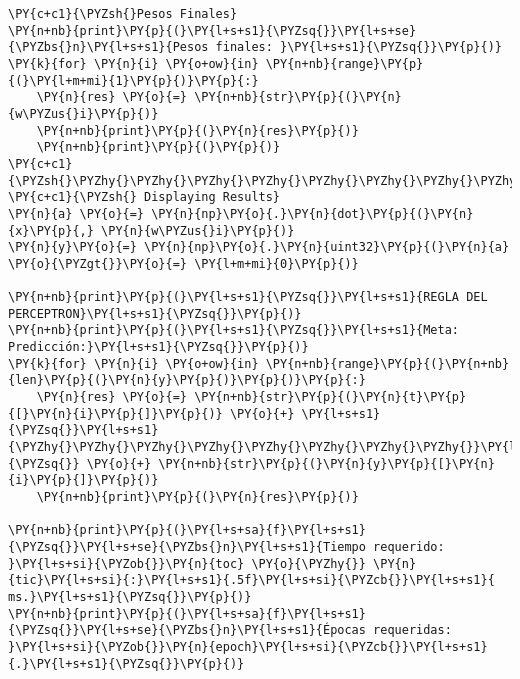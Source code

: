     \begin{tcolorbox}[breakable, size=fbox, boxrule=1pt, pad at break*=1mm,colback=cellbackground, colframe=cellborder]
\begin{Verbatim}[commandchars=\\\{\}]
\PY{c+c1}{\PYZsh{}Pesos Finales}
\PY{n+nb}{print}\PY{p}{(}\PY{l+s+s1}{\PYZsq{}}\PY{l+s+se}{\PYZbs{}n}\PY{l+s+s1}{Pesos finales: }\PY{l+s+s1}{\PYZsq{}}\PY{p}{)}
\PY{k}{for} \PY{n}{i} \PY{o+ow}{in} \PY{n+nb}{range}\PY{p}{(}\PY{l+m+mi}{1}\PY{p}{)}\PY{p}{:}
    \PY{n}{res} \PY{o}{=} \PY{n+nb}{str}\PY{p}{(}\PY{n}{w\PYZus{}i}\PY{p}{)}
    \PY{n+nb}{print}\PY{p}{(}\PY{n}{res}\PY{p}{)}
    \PY{n+nb}{print}\PY{p}{(}\PY{p}{)}
\PY{c+c1}{\PYZsh{}\PYZhy{}\PYZhy{}\PYZhy{}\PYZhy{}\PYZhy{}\PYZhy{}\PYZhy{}\PYZhy{}\PYZhy{}\PYZhy{}\PYZhy{}\PYZhy{}\PYZhy{}\PYZhy{}\PYZhy{}\PYZhy{}\PYZhy{}\PYZhy{}\PYZhy{}\PYZhy{}\PYZhy{}\PYZhy{}\PYZhy{}\PYZhy{}\PYZhy{}\PYZhy{}\PYZhy{}\PYZhy{}\PYZhy{}\PYZhy{}\PYZhy{}\PYZhy{}\PYZhy{}\PYZhy{}\PYZhy{}\PYZhy{}\PYZhy{}\PYZhy{}\PYZhy{}\PYZhy{}\PYZhy{}\PYZhy{}\PYZhy{}\PYZhy{}\PYZhy{}\PYZhy{}\PYZhy{}\PYZhy{}\PYZhy{}\PYZhy{}\PYZhy{}\PYZhy{}\PYZhy{}\PYZhy{}\PYZhy{}\PYZhy{}\PYZhy{}\PYZhy{}\PYZhy{}\PYZhy{}\PYZhy{}\PYZhy{}\PYZhy{}\PYZhy{}\PYZhy{}\PYZhy{}}
\PY{c+c1}{\PYZsh{} Displaying Results}
\PY{n}{a} \PY{o}{=} \PY{n}{np}\PY{o}{.}\PY{n}{dot}\PY{p}{(}\PY{n}{x}\PY{p}{,} \PY{n}{w\PYZus{}i}\PY{p}{)}
\PY{n}{y}\PY{o}{=} \PY{n}{np}\PY{o}{.}\PY{n}{uint32}\PY{p}{(}\PY{n}{a} \PY{o}{\PYZgt{}}\PY{o}{=} \PY{l+m+mi}{0}\PY{p}{)}

\PY{n+nb}{print}\PY{p}{(}\PY{l+s+s1}{\PYZsq{}}\PY{l+s+s1}{REGLA DEL PERCEPTRON}\PY{l+s+s1}{\PYZsq{}}\PY{p}{)}
\PY{n+nb}{print}\PY{p}{(}\PY{l+s+s1}{\PYZsq{}}\PY{l+s+s1}{Meta:    Predicción:}\PY{l+s+s1}{\PYZsq{}}\PY{p}{)}
\PY{k}{for} \PY{n}{i} \PY{o+ow}{in} \PY{n+nb}{range}\PY{p}{(}\PY{n+nb}{len}\PY{p}{(}\PY{n}{y}\PY{p}{)}\PY{p}{)}\PY{p}{:}
    \PY{n}{res} \PY{o}{=} \PY{n+nb}{str}\PY{p}{(}\PY{n}{t}\PY{p}{[}\PY{n}{i}\PY{p}{]}\PY{p}{)} \PY{o}{+} \PY{l+s+s1}{\PYZsq{}}\PY{l+s+s1}{\PYZhy{}\PYZhy{}\PYZhy{}\PYZhy{}\PYZhy{}\PYZhy{}\PYZhy{}\PYZhy{}}\PY{l+s+s1}{\PYZsq{}} \PY{o}{+} \PY{n+nb}{str}\PY{p}{(}\PY{n}{y}\PY{p}{[}\PY{n}{i}\PY{p}{]}\PY{p}{)}
    \PY{n+nb}{print}\PY{p}{(}\PY{n}{res}\PY{p}{)}

\PY{n+nb}{print}\PY{p}{(}\PY{l+s+sa}{f}\PY{l+s+s1}{\PYZsq{}}\PY{l+s+se}{\PYZbs{}n}\PY{l+s+s1}{Tiempo requerido: }\PY{l+s+si}{\PYZob{}}\PY{n}{toc} \PY{o}{\PYZhy{}} \PY{n}{tic}\PY{l+s+si}{:}\PY{l+s+s1}{.5f}\PY{l+s+si}{\PYZcb{}}\PY{l+s+s1}{ ms.}\PY{l+s+s1}{\PYZsq{}}\PY{p}{)}
\PY{n+nb}{print}\PY{p}{(}\PY{l+s+sa}{f}\PY{l+s+s1}{\PYZsq{}}\PY{l+s+se}{\PYZbs{}n}\PY{l+s+s1}{Épocas requeridas: }\PY{l+s+si}{\PYZob{}}\PY{n}{epoch}\PY{l+s+si}{\PYZcb{}}\PY{l+s+s1}{.}\PY{l+s+s1}{\PYZsq{}}\PY{p}{)}
\end{Verbatim}
\end{tcolorbox}

